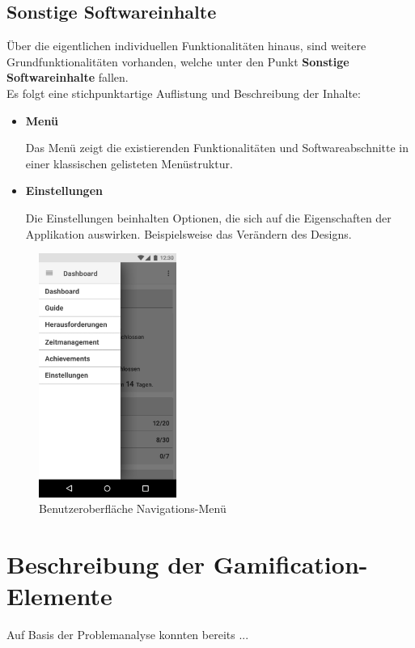 \documentclass{scrreprt}
\begin{document}
\newpage
\subsection{Sonstige Softwareinhalte}
\par Über die eigentlichen individuellen Funktionalitäten hinaus, sind weitere Grundfunktionalitäten vorhanden, welche unter den Punkt \textbf{Sonstige Softwareinhalte} fallen.\\

Es folgt eine stichpunktartige Auflistung und Beschreibung der Inhalte:
\begin{itemize}
\item \textbf{Menü}
\par Das Menü zeigt die existierenden Funktionalitäten und Softwareabschnitte in einer klassischen gelisteten Menüstruktur.
\item \textbf{Einstellungen}
\par Die Einstellungen beinhalten Optionen, die sich auf die Eigenschaften der Applikation auswirken. Beispielsweise das Verändern des Designs.
\end{itemize}

\begin{figure}[H]
	\centering
	\includegraphics[width=0.4\textwidth,keepaspectratio]{Bilder/Menu.png}
	\caption{Benutzeroberfläche Navigations-Menü}
	\label{img:navigation}
\end{figure}

\newpage
\section{Beschreibung der Gamification-Elemente}
Auf Basis der Problemanalyse konnten bereits ...
\end{document}
